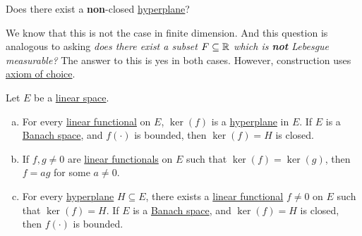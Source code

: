 \begin{problem}
Does there exist a \textbf{non}-closed \hyperref[def:hyperplane]{hyperplane}?
\end{problem}
\begin{answer}
	We know that this is not the case in finite dimension. And this question is analogous to asking \emph{does there exist a subset \(F\subseteq \mathbb{\MakeUppercase{r}} \) which is \textbf{not} Lebesgue measurable?} The answer to this is yes in both cases. However, construction uses \href{https://en.wikipedia.org/wiki/Axiom_of_choice}{axiom of choice}.
\end{answer}

\begin{proposition}\label{prop:lec5-1}
	Let \(E\) be a \hyperref[def:linear-vector-space]{linear space}.
	\begin{enumerate}[(a)]
		\item For every \hyperref[def:linear-functional]{linear functional} on \(E\), \(\ker(f)\) is a \hyperref[def:hyperplane]{hyperplane} in \(E\). If \(E\) is a \hyperref[def:Banach-space]{Banach space}, and \(f(\cdot)\) is bounded, then \(\ker(f) = H\) is closed.
		\item If \(f, g \neq 0\) are \hyperref[def:linear-functional]{linear functionals} on \(E\) such that \(\ker(f) = \ker(g)\), then \(f = ag\) for some \(a \neq 0\).
		\item For every \hyperref[def:hyperplane]{hyperplane} \(H\subseteq E\), there exists a \hyperref[def:linear-functional]{linear functional} \(f \neq 0\) on \(E\) such that \(\ker(f) = H\). If \(E\) is a \hyperref[def:Banach-space]{Banach space}, and \(\ker(f) = H\) is closed, then \(f(\cdot)\) is bounded.
	\end{enumerate}
\end{proposition}